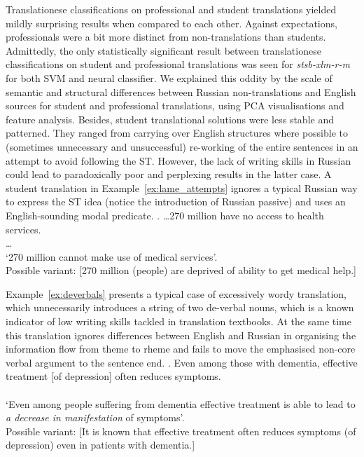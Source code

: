 Translationese classifications on professional and student translations yielded mildly surprising results when compared to each other. Against expectations, professionals were a bit more distinct from non-translations than students. Admittedly, the only statistically significant result between translationese classifications on student and professional translations was seen for \textit{stsb-xlm-r-m} for both SVM and neural classifier.  
We explained this oddity by the scale of semantic and structural differences between Russian non-translations and English sources for student and professional translations, using PCA visualisations and feature analysis. 
Besides, student translational solutions were less stable and patterned. They ranged from carrying over English structures where possible to (sometimes unnecessary and unsuccessful) re-working of the entire sentences in an attempt to avoid following the ST. However, the lack of writing skills in Russian could lead to paradoxically poor and perplexing results in the latter case. 
A student translation in Example~\ref{ex:lame_attempts} ignores a typical Russian way to express the ST idea (notice the introduction of Russian passive) and uses an English-sounding modal predicate.
\ex. \label{ex:lame_attempts}\hspace{1pt}
\dots 270 million have no access to health services.\\
\dots {}\\
`270 million cannot make use of medical services'.\\
Possible variant:  [270 million (people) are deprived of ability to get medical help.]

Example~\ref{ex:deverbals} presents a typical case of excessively wordy translation, which unnecessarily introduces a string of two de-verbal nouns, which is a known indicator of low writing skills tackled in translation textbooks. At the same time this translation ignores differences between English and Russian in organising the information flow from theme to rheme and fails to move the emphasised non-core verbal argument to the sentence end.  
\ex. \label{ex:deverbals}\hspace{1pt}
Even among those with dementia, effective treatment [of depression] often reduces symptoms.\\
\\
`Even among people suffering from dementia effective treatment is able to lead to \textit{a decrease in manifestation} of symptoms'.\\
Possible variant:  [It is known that effective treatment often reduces symptoms (of depression) even in patients with dementia.]

